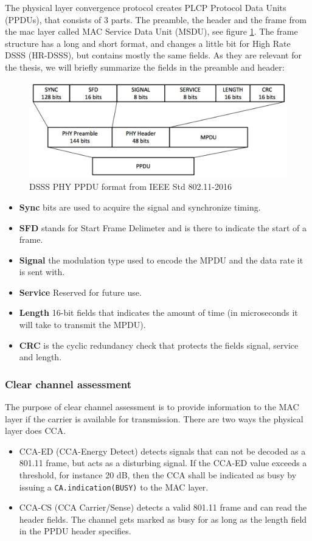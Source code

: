 \documentclass[a4paper,UKenglish]{report}
\begin{document}
The physical layer convergence protocol creates PLCP Protocol Data Units (PPDUs), 
that consists of 3 parts. The preamble, the header and the frame from the mac layer
called MAC Service Data Unit (MSDU), see figure \ref{fig:PPDU}. The frame structure
has a long and short format, and changes a little bit for High Rate DSSS (HR-DSSS),
but contains mostly the same fields. As they are relevant for the thesis,
we will briefly summarize the fields in the preamble and header:

\begin{figure}
	\center
	\includegraphics[scale=0.5]{Images/PPDU.png}
	\caption{DSSS PHY PPDU format from IEEE Std 802.11-2016  }
	\label{fig:PPDU}
\end{figure}


\begin{itemize}
	\item \textbf{Sync} bits are used to acquire the signal and synchronize timing. 
	\item \textbf{SFD} stands for Start Frame Delimeter and is there to indicate the start of a frame.  
	\item \textbf{Signal} the modulation type used to encode the MPDU and
		the data rate it is sent with. 
	\item \textbf{Service} Reserved for future use. 
	\item \textbf{Length} 16-bit fields that indicates the amount of time (in
		microseconds it will take to transmit the MPDU).
	\item \textbf{CRC} is the cyclic redundancy check that protects
		the fields signal, service and length. 
\end{itemize}

\subsubsection{Clear channel assessment}
The purpose of clear channel assessment is to provide information to the MAC layer if the carrier is available for transmission. There
are two ways the physical layer does CCA.
\begin{itemize}
	\item CCA-ED (CCA-Energy Detect) detects signals that can not be decoded as a 801.11 frame, but acts as a disturbing signal. If the CCA-ED value 
		exceeds a threshold, for instance 20 dB, then the CCA shall be indicated as busy by issuing a \verb|CA.indication(BUSY)| to the MAC layer.  
	\item CCA-CS (CCA Carrier/Sense) detects a valid 801.11 frame and can
		read the header fields. The channel
		gets marked as busy for as long as the length field in the
		PPDU header specifies. 
\end{itemize}
\end{document}
